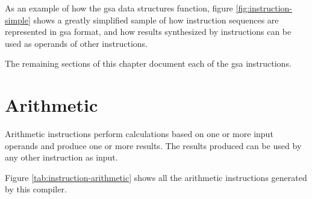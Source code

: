 As an example of how the \ac{gsa} data structures function, figure
\ref{fig:instruction-simple} shows a greatly simplified sample of how
instruction sequences are represented in \ac{gsa} format, and how
results synthesized by instructions can be used as operands of other
instructions.

The remaining sections of this chapter document each of the \ac{gsa}
instructions.


\section{Arithmetic}\label{class:arithmetic}

Arithmetic instructions perform calculations based on one or more
input operands and produce one or more results.  The results produced
can be used by any other instruction as input.

Figure \ref{tab:instruction-arithmetic} shows all the arithmetic
instructions generated by this compiler.

